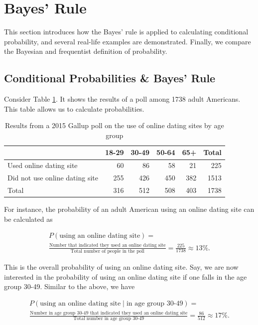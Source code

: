 \documentclass[]{book}
\theoremstyle{definition}
\theoremstyle{definition}
\theoremstyle{definition}
\theoremstyle{remark}
\begin{document}
\section{Bayes' Rule}\label{bayes-rule}

This section introduces how the Bayes' rule is applied to calculating
conditional probability, and several real-life examples are
demonstrated. Finally, we compare the Bayesian and frequentist
definition of probability.

\subsection{Conditional Probabilities \& Bayes'
Rule}\label{sec:bayes-rule}

Consider Table \ref{tab:2015gallupDating}. It shows the results of a
poll among 1738 adult Americans. This table allows us to calculate
probabilities.

\begin{table}

\caption{\label{tab:2015gallupDating}Results from a 2015 Gallup poll on the use of online dating sites by age group}
\centering
\begin{tabular}[t]{lrrrrr}
\toprule
  & 18-29 & 30-49 & 50-64 & 65+ & Total\\
\midrule
Used online dating site & 60 & 86 & 58 & 21 & 225\\
Did not use online dating site & 255 & 426 & 450 & 382 & 1513\\
Total & 316 & 512 & 508 & 403 & 1738\\
\bottomrule
\end{tabular}
\end{table}

For instance, the probability of an adult American using an online
dating site can be calculated as

\begin{multline*}
    P(\text{using an online dating site}) = \\
    \frac{\text{Number that indicated they used an online dating site}}{\text{Total number of people in the poll}}
    = \frac{225}{1738} \approx 13\%.
\end{multline*}

This is the overall probability of using an online dating site. Say, we
are now interested in the probability of using an online dating site if
one falls in the age group 30-49. Similar to the above, we have

\begin{multline*}
    P(\text{using an online dating site} \mid \text{in age group 30-49}) = \\
    \frac{\text{Number in age group 30-49 that indicated they used an online dating site}}{\text{Total number in age group 30-49}}
    = \frac{86}{512} \approx 17\%.
\end{multline*}
\end{document}
